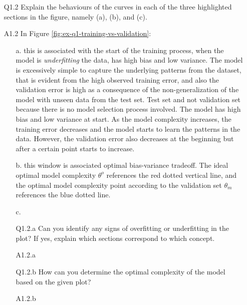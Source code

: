 \documentclass[unicode, 11pt, a4paper]{scrartcl}
\begin{document}
\begin{itemize}
	\item[Q1.2] Explain the behaviours of the curves in each of the three highlighted sections in the figure, namely (a), (b), and (c).
	\item[A1.2] In Figure \ref{fig:ex-q1-training-vs-validation}:
	      \begin{itemize}
		      \item[a.] this is associated with the start of the training process,
		            when the model is \textit{underfitting} the data, has high bias and low variance.
		            The model is excessively simple to capture the underlying patterns from the dataset,
		            that is evident from the high observed training error,
		            and also the validation error is high as a consequence of the non-generalization of the model
		            with unseen data from the test set.
		            Test set and not validation set because there is no model selection process involved.
		            The model has high bias and low variance at start.
		            As the model complexity increases, the training error decreases
		            and the model starts to learn the patterns in the data.
		            However, the validation error also decreases at the beginning
		            but after a certain point starts to increase.

		      \item[b.] this window is associated optimal bias-variance tradeoff.
		            The ideal optimal model complexity $\theta^o$ references the red dotted vertical line,
		            and the optimal model complexity point according to the validation set $\theta_m$
		            references the blue dotted line.



		      \item[c.]
	      \end{itemize}

	      \begin{itemize}
		      \item[Q1.2.a] Can you identify any signs of overfitting or underfitting in the plot?
		            If yes, explain which sections correspond to which concept.
		      \item[A1.2.a] ~\\

		      \item[Q1.2.b] How can you determine the optimal complexity of the model based on the given plot?
		      \item[A1.2.b] ~\\
	      \end{itemize}


\end{itemize}
\end{document}
